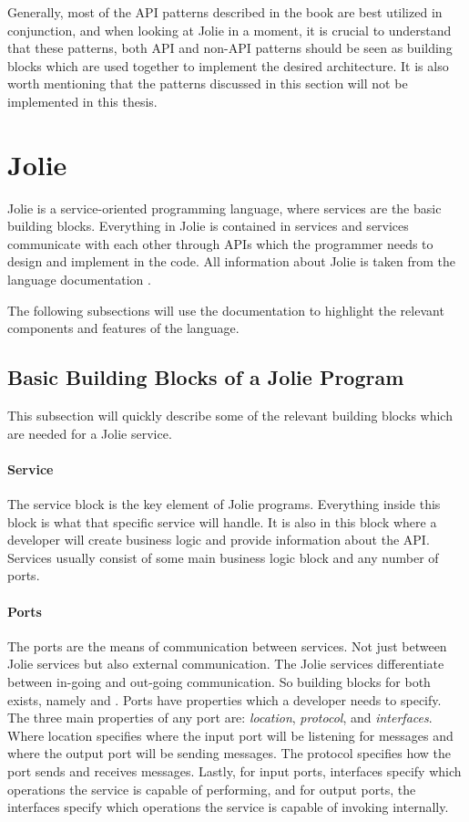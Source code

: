 Generally, most of the API patterns described in the book are best utilized in conjunction,
and when looking at Jolie in a moment, it is crucial to understand that these patterns, both API and non-API patterns
should be seen as building blocks which are used together to implement the desired architecture.
It is also worth mentioning that the patterns discussed in this section will not be implemented in this thesis.

\section{Jolie}
Jolie is a service-oriented programming language, where services are the basic building blocks.
Everything in Jolie is contained in services and services communicate with each other through APIs which the programmer needs to design and implement in the code. All information about Jolie 
is taken from the language documentation \cite{jolie}.

The following subsections will use the documentation to highlight the relevant components and features of the language.

\subsection{Basic Building Blocks of a Jolie Program}
This subsection will quickly describe some of the relevant building blocks which are needed for a Jolie service.

\paragraph{Service} The service block is the key element of Jolie programs. Everything inside this block is what that specific service will handle. It is also 
in this block where a developer will create business logic and provide information about the API. Services usually consist of some main business logic block and any number of ports.

\paragraph{Ports} The ports are the means of communication between services. Not just between Jolie services but also external communication.
The Jolie services differentiate between in-going and out-going communication. So building blocks for both exists, namely  and .
Ports have properties which a developer needs to specify. The three main properties of any port are: \emph{location}, \emph{protocol}, and \emph{interfaces}.
Where location specifies where the input port will be listening for messages and where the output port will be sending messages.
The protocol specifies how the port sends and receives messages. Lastly, for input ports, interfaces specify which
operations the service is capable of performing, and for output ports, the interfaces specify which
operations the service is capable of invoking internally. 

